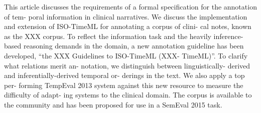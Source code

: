 This article discusses the requirements of a formal specification for the annotation of tem- poral information in clinical narratives. We discuss the implementation and extension of ISO-TimeML for annotating a corpus of clini- cal notes, known as the XXX corpus. To reflect the information task and the heavily inference- based reasoning demands in the domain, a new annotation guideline has been developed, ``the XXX Guidelines to ISO-TimeML (XXX- TimeML)''. To clarify what relations merit an- notation, we distinguish between linguistically- derived and inferentially-derived temporal or- derings in the text. We also apply a top per- forming TempEval 2013 system against this new resource to measure the difficulty of adapt- ing systems to the clinical domain. The corpus is available to the community and has been proposed for use in a SemEval 2015 task.
